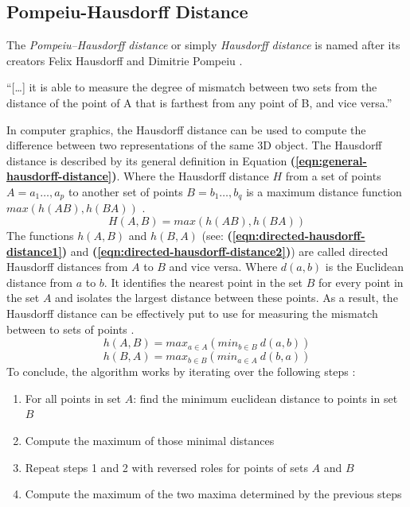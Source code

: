 \subsection{Pompeiu-Hausdorff Distance}
The \textit{Pompeiu–Hausdorff distance} or simply \textit{Hausdorff distance} is named after its creators Felix Hausdorff and Dimitrie Pompeiu \cite{birsanOneHundredYears2006}.
\begin{displayquote}
	``[\ldots] it is able to measure the degree of mismatch between two sets from the distance of the point of A that is farthest from any point of B, and vice versa.''
\end{displayquote}
In computer graphics, the Hausdorff distance can be used to compute the difference between two representations of the same 3D object.
The Hausdorff distance is described by its general definition in Equation \textbf{(\ref{eqn:general-hausdorff-distance})}.
Where the Hausdorff distance $H$ from a set of points $A={a_{1}\ldots,a_{p}}$ to another set of points $B={b_{1}\ldots,b_{q}}$ is a maximum distance function $max(h(AB),h(BA))$ \cite{hausdorffGrundzuegeMengenlehre1978,simBrainVentricleDetection2016,gegoireHausdorffDistanceConvex1998}.
\begin{equation}\label{eqn:general-hausdorff-distance}
	H(A,B)=max(h(AB),h(BA))
\end{equation}
The functions $h(A,B)$ and $h(B,A)$ (see: \textbf{(\ref{eqn:directed-hausdorff-distance1})} and \textbf{(\ref{eqn:directed-hausdorff-distance2})}) are called directed Hausdorff distances from $A$ to $B$ and vice versa.
Where $d(a,b)$ is the Euclidean distance from $a$ to $b$.
It identifies the nearest point in the set $B$ for every point in the set $A$ and isolates the largest distance between these points.
As a result, the Hausdorff distance can be effectively put to use for measuring the mismatch between to sets of points \cite{hausdorffGrundzuegeMengenlehre1978,simBrainVentricleDetection2016,gegoireHausdorffDistanceConvex1998}.
\begin{equation}\label{eqn:directed-hausdorff-distance1}
	h(A,B)=max_{a \in A}(min_{b \in B}\ d(a,b))
\end{equation}
\begin{equation}\label{eqn:directed-hausdorff-distance2}
	h(B,A)=max_{b \in B}(min_{a \in A}\ d(b,a))
\end{equation}
To conclude, the algorithm works by iterating over the following steps \cite{hausdorffGrundzuegeMengenlehre1978,simBrainVentricleDetection2016,gegoireHausdorffDistanceConvex1998}:
\begin{enumerate}
	\item For all points in set $A$: find the minimum euclidean distance to points in set $B$
	\item Compute the maximum of those minimal distances
	\item Repeat steps 1 and 2 with reversed roles for points of sets $A$ and $B$
	\item Compute the maximum of the two maxima determined by the previous steps
\end{enumerate}


